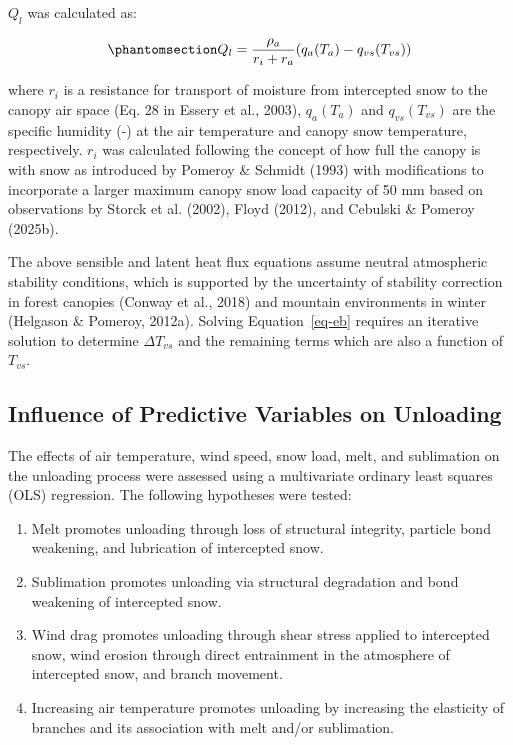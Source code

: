 \documentclass[
]{agujournal2019}
\providecommand{\tightlist}{%
  \setlength{\itemsep}{0pt}\setlength{\parskip}{0pt}}
\begin{document}
\(Q_l\) was calculated as:

\begin{equation}\phantomsection\label{eq-ql}{
Q_l = \frac{\rho_a}{r_i+r_a} (q_a(T_a) - q_{vs}(T_{vs}))
}\end{equation}

where \(r_i\) is a resistance for transport of moisture from intercepted
snow to the canopy air space (Eq. 28 in Essery et al., 2003),
\(q_a(T_a)\) and \(q_{vs}(T_{vs})\) are the specific humidity (-) at the
air temperature and canopy snow temperature, respectively. \(r_i\) was
calculated following the concept of how full the canopy is with snow as
introduced by Pomeroy \& Schmidt (1993) with modifications to
incorporate a larger maximum canopy snow load capacity of 50 mm based on
observations by Storck et al. (2002), Floyd (2012), and Cebulski \&
Pomeroy (2025b).

The above sensible and latent heat flux equations assume neutral
atmospheric stability conditions, which is supported by the uncertainty
of stability correction in forest canopies (Conway et al., 2018) and
mountain environments in winter (Helgason \& Pomeroy, 2012a). Solving
Equation~\ref{eq-eb} requires an iterative solution to determine
\(\Delta T_{vs}\) and the remaining terms which are also a function of
\(T_{vs}\).

\subsection{Influence of Predictive Variables on
Unloading}\label{influence-of-predictive-variables-on-unloading}

The effects of air temperature, wind speed, snow load, melt, and
sublimation on the unloading process were assessed using a multivariate
ordinary least squares (OLS) regression. The following hypotheses were
tested:

\begin{enumerate}
\def\labelenumi{\alph{enumi}.}
\tightlist
\item
  Melt promotes unloading through loss of structural integrity, particle
  bond weakening, and lubrication of intercepted snow.
\item
  Sublimation promotes unloading via structural degradation and bond
  weakening of intercepted snow.
\item
  Wind drag promotes unloading through shear stress applied to
  intercepted snow, wind erosion through direct entrainment in the
  atmosphere of intercepted snow, and branch movement.
\item
  Increasing air temperature promotes unloading by increasing the
  elasticity of branches and its association with melt and/or
  sublimation.
\end{enumerate}
\end{document}
